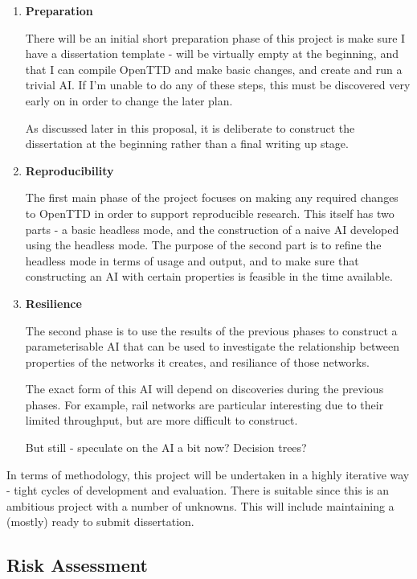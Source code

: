 \documentclass[a4paper,11pt]{article}
\begin{document}
\begin{enumerate}
\addtocounter{enumi}{-1}
    \item \textbf{Preparation}

    There will be an initial short preparation phase of this project is make sure I have a dissertation template - will be virtually empty at the beginning, and that I can compile OpenTTD and make basic changes, and create and run a trivial AI. If I'm unable to do any of these steps, this must be discovered very early on in order to change the later plan.

    As discussed later in this proposal, it is deliberate to construct the dissertation at the beginning rather than a final writing up stage.
    
    \item \textbf{Reproducibility}

    The first main phase of the project focuses on making any required changes to OpenTTD in order to support reproducible research. This itself has two parts - a basic headless mode, and the construction of a naive AI developed using the headless mode. The purpose of the second part is to refine the headless mode in terms of usage and output, and to make sure that constructing an AI with certain properties is feasible in the time available.
    
    \item \textbf{Resilience}

    The second phase is to use the results of the previous phases to construct a parameterisable AI that can be used to investigate the relationship between properties of the networks it creates, and resiliance of those networks.

    The exact form of this AI will depend on discoveries during the previous phases. For example, rail networks are particular interesting due to their limited throughput, but are more difficult to construct.

    But still - speculate on the AI a bit now? Decision trees?
    
\end{enumerate}

In terms of methodology, this project will be undertaken in a highly iterative way - tight cycles of development and evaluation. There is suitable since this is an ambitious project with a number of unknowns. This will include maintaining a (mostly) ready to submit dissertation.

\subsection{Risk Assessment}
\label{riskassessment}
\end{document}
